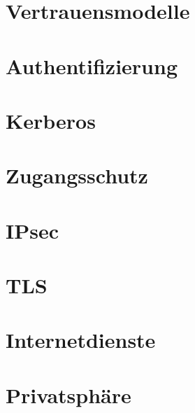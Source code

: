 \section{Vertrauensmodelle}



\section{Authentifizierung}



\section{Kerberos}



\section{Zugangsschutz}



\section{IPsec}



\section{TLS}



\section{Internetdienste}



\section{Privatsphäre}

